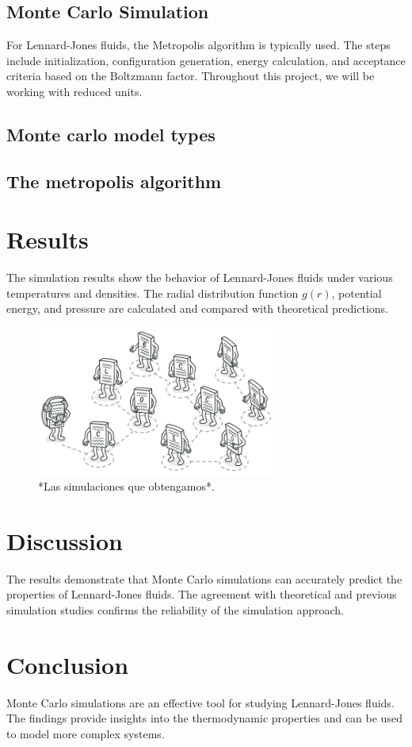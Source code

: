 \documentclass[a4paper,12pt]{article}
\begin{document}
\subsection{Monte Carlo Simulation}
For Lennard-Jones fluids, the Metropolis algorithm is typically used. The steps include initialization, configuration generation, energy calculation, and acceptance criteria based on the Boltzmann factor.
Throughout this project, we will be working with reduced units. 
\subsection{Monte carlo model types}

\subsection{ The metropolis algorithm}

\section{Results}
The simulation results show the behavior of Lennard-Jones fluids under various temperatures and densities. The radial distribution function \( g(r) \), potential energy, and pressure are calculated and compared with theoretical predictions.

\begin{figure}[h]
    \centering
    \includegraphics[width=0.7\textwidth]{08.png}
    \caption{*Las simulaciones que obtengamos*.}
    \label{fig:gr}
\end{figure}

\section{Discussion}
The results demonstrate that Monte Carlo simulations can accurately predict the properties of Lennard-Jones fluids. The agreement with theoretical and previous simulation studies confirms the reliability of the simulation approach. 

\section{Conclusion}
Monte Carlo simulations are an effective tool for studying Lennard-Jones fluids. The findings provide insights into the thermodynamic properties and can be used to model more complex systems. 



\end{document}
